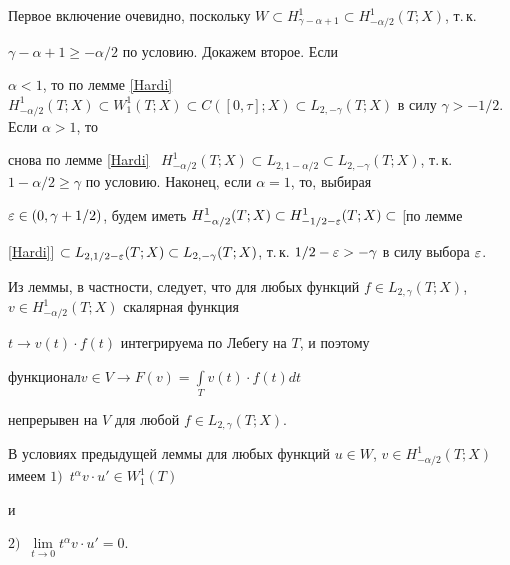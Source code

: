 \begin{pf}


Первое включение очевидно, поскольку $W \subset


H^1_{\gamma-\alpha+1} \subset H^1_{-\alpha/2}(T;X)$, т.\,к.


$\gamma-\alpha+1 \ge -\alpha/2$ по условию. Докажем второе. Если


$\alpha < 1$, то по лемме \ref{Hardi} \ $H^1_{-\alpha/2}(T;X)


\subset W^1_1(T;X) \subset C([0,\tau];X) \subset


L_{2,-\gamma}(T;X)$ в силу $\gamma > -1/2$. Если $\alpha > 1$, то


снова по лемме \ref{Hardi} \ $H^1_{-\alpha/2}(T;X) \subset


L_{2,1-\alpha/2} \subset L_{2,-\gamma}(T;X)$, т.\,к. $1-\alpha/2


\ge \gamma$ по условию. Наконец, если $\alpha=1$, то, выбирая


$\eps \in (0, \gamma+1/2)$, будем иметь $H^1_{-\alpha/2}(T;X)


\subset H^1_{-1/2-\eps}(T;X) \subset$ [по лемме


\ref{Hardi}] $\subset L_{2,1/2-\eps}(T;X) \subset


L_{2,-\gamma}(T;X)$, т.\,к. $1/2-\eps> -\gamma$ в силу выбора $\eps$.


\end{pf}





Из леммы, в частности, следует, что для любых функций $f \in


L_{2,\gamma}(T;X)$, $v \in H^1_{-\alpha/2}(T;X)$ скалярная функция


$t \to v(t) \cdot f(t)$ интегрируема по Лебегу на $T$, и поэтому


функционал\linebreak $v \in V \to F(v)=\int\limits_T v(t) \cdot f(t) dt$


непрерывен на $V$ для любой $f \in L_{2,\gamma}(T;X)$.








\begin{lems}\label{Inzero}


В условиях предыдущей леммы для любых функций $u \in W$, $v \in


H^1_{-\alpha/2}(T;X)$ имеем  $1)$~$t^\alpha v \cdot u' \in W^1_1(T)$


и


$2)$~$\lim\limits_{t \to 0} t^\alpha v \cdot u' = 0$.


\end{lems}








